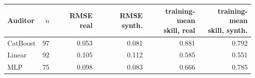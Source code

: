 \begin{tabular}{@{}lrrrrr@{}}
\toprule
Auditor & $n$ & RMSE real & RMSE synth. & \shortstack{training-mean\\skill, real} & \shortstack{training-mean\\skill, synth.} \\
\midrule
CatBoost & 97 & 0.053 & 0.081 & 0.881 & 0.792 \\
Linear & 92 & 0.105 & 0.112 & 0.585 & 0.551 \\
MLP & 75 & 0.098 & 0.083 & 0.666 & 0.785 \\
\bottomrule
\end{tabular}
